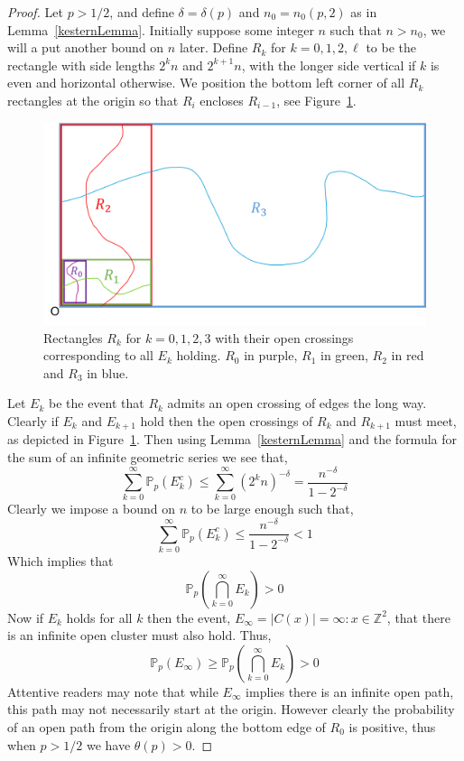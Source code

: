 \documentclass[a4paper,11pt]{article}
\theoremstyle{definition}
\newcommand{\ints}{\mathbb{Z}}
\newcommand{\prob}{\mathbb{P}_p}
\begin{document}
\begin{proof}
	Let $p >1/2$, and define $\delta = \delta(p)$ and $n_0 = n_0(p,2)$ as in Lemma~\ref*{kesternLemma}. Initially suppose some integer $n$ such that $n > n_0$, we will a put another bound on $n$ later. Define $R_k$ for $k = 0,1,2,\ell$ to be the rectangle with side lengths $2^{k}n$ and $2^{k+1}n$, with the longer side vertical if $k$ is even and horizontal otherwise. We position the bottom left corner of all $R_k$ rectangles at the origin so that $R_i$ encloses $R_{i-1}$, see Figure~\ref*{fig:KesternRectangle}.

	\begin{figure}
		\centering
		\includegraphics[scale=0.58]{drawings/kestenRectangles.png}
		\caption{Rectangles $R_k$ for $k=0,1,2,3$ with their open crossings corresponding to all $E_k$ holding. $R_0$ in purple, $R_1$ in green, $R_2$ in red and $R_3$ in blue.}
		\label{fig:KesternRectangle}
	\end{figure}

	Let $E_k$ be the event that $R_k$ admits an open crossing of edges the long way. Clearly if $E_k$ and $E_{k+1}$ hold then the open crossings of $R_k$ and $R_{k+1}$ must meet, as depicted in Figure~\ref*{fig:KesternRectangle}. Then using Lemma~\ref*{kesternLemma} and the formula for the sum of an infinite geometric series we see that,
	$$\sum_{k=0}^{\infty}\prob(E^c_k) \leq \sum_{k=0}^{\infty}(2^kn)^{-\delta} = \frac{n^{-\delta}}{1-2^{-\delta}}$$
	Clearly we impose a bound on $n$ to be large enough such that,
	$$\sum_{k=0}^{\infty}\prob(E^c_k) \leq  \frac{n^{-\delta}}{1-2^{-\delta}} < 1$$
	Which implies that $$\prob\left(\bigcap_{k=0}^{\infty}E_k\right)>0$$
	Now if $E_k$ holds for all $k$ then the event, $E_{\infty} = {|C(x)| = \infty: x \in \ints^2}$, that there is an infinite open cluster must also hold. Thus,
	$$\prob(E_{\infty}) \geq \prob\left(\bigcap_{k=0}^{\infty}E_k\right)>0$$
	Attentive readers may note that while $E_{\infty}$ implies there is an infinite open path, this path may not necessarily start at the origin. However clearly the probability of an open path from the origin along the bottom edge of $R_0$ is positive, thus when $p>1/2$ we have $\theta(p) >0$. 

\end{proof}
\end{document}
